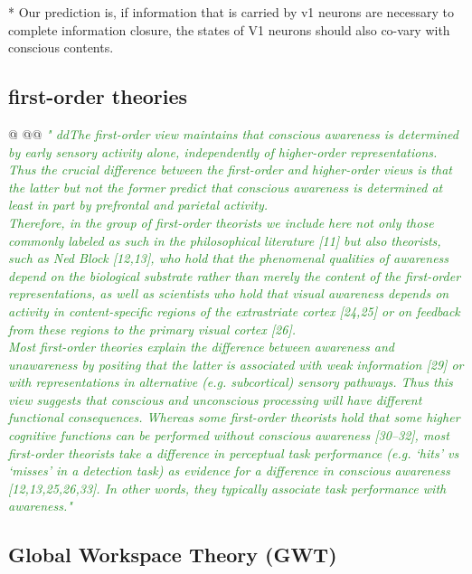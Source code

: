 \documentclass[utf8]{article}
\newenvironment{ants}
			{
			 \begin{easylist}[itemize]
			}
			{
			\end{easylist}
			}
\newcommand{\rewrite}[1]{\textcolor{ForestGreen}{\textit{"#1"}}\newline}
\begin{document}
				* Our prediction is, if information that is carried by v1 neurons are necessary to complete information closure, the states of V1 neurons should also co-vary with conscious contents. 	
				
		\subsection{first-order theories}
			\begin{ants}
				@\cite{lau2011empirical}
					@@ \rewrite{
						ddThe ﬁrst-order view maintains that conscious awareness is determined by early sensory activity alone, independently of higher-order representations. Thus the crucial difference between the ﬁrst-order and higher-order views is that the latter but not the former predict that conscious awareness is determined at least in part by prefrontal and parietal activity.\\
						Therefore, in the group of ﬁrst-order theorists we include here not only those commonly labeled as such in the philosophical literature [11] but also theorists, such as Ned Block [12,13], who hold that the phenomenal qualities of awareness depend on the biological substrate rather than merely the content of the ﬁrst-order representations, as well as scientists who hold that visual awareness depends on activity in content-speciﬁc regions of the extrastriate cortex [24,25] or on feedback from these regions to the primary visual cortex [26].\\
						Most ﬁrst-order theories explain the difference between awareness and unawareness by positing that the latter is associated with weak information [29] or with representations in alternative (e.g. subcortical) sensory pathways. Thus this view suggests that conscious and unconscious processing will have different functional consequences. Whereas some ﬁrst-order theorists hold that some higher cognitive functions can be performed without conscious awareness [30–32], most ﬁrst-order theorists take a difference in perceptual task performance (e.g. ‘hits’ vs ‘misses’ in a detection task) as evidence for a difference in conscious awareness [12,13,25,26,33]. In other words, they typically associate task performance with awareness.}
				
			\end{ants}
		
		
		\subsection{Global Workspace Theory (GWT)}
\end{document}
